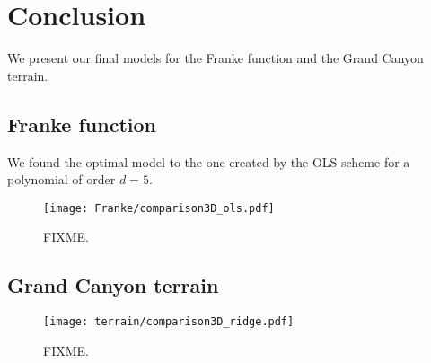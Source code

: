 \section{Conclusion}\label{sec:conclusion}


We present our final models for the Franke function and the Grand Canyon terrain. 


\subsection{Franke function}
 
We found the optimal model to the one created by the OLS scheme for a polynomial of order $d=5$. 

\begin{figure}
    \texttt{[image: Franke/comparison3D\_ols.pdf]}
    \caption{FIXME.}
    \label{fig:franke_final_model}
\end{figure}



\subsection{Grand Canyon terrain}

\begin{figure}
    \texttt{[image: terrain/comparison3D\_ridge.pdf]}
    \caption{FIXME.}
    \label{fig:gc_final_model}
\end{figure}
